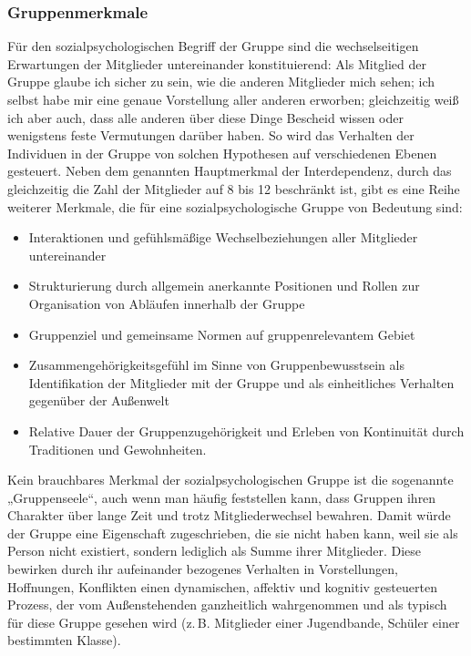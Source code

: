 \documentclass[12pt]{scrartcl}
\DeclareRobustCommand{\zB}{z.\,B.\xspace}
\begin{document}
\subsubsection{Gruppenmerkmale} \label{subsec:Gruppenmerkmale}
Für den sozialpsychologischen Begriff der Gruppe sind die wechselseitigen
Erwartungen der Mitglieder untereinander konstituierend: Als Mitglied der
Gruppe glaube ich sicher zu sein, wie die anderen Mitglieder mich sehen; ich
selbst habe mir eine genaue Vorstellung aller anderen erworben; gleichzeitig
weiß ich aber auch, dass alle anderen über diese Dinge Bescheid wissen oder
wenigstens feste Vermutungen darüber haben. So wird das Verhalten der
Individuen in der Gruppe von solchen Hypothesen auf verschiedenen Ebenen
gesteuert. Neben dem genannten Hauptmerkmal der Interdependenz, durch das
gleichzeitig die Zahl der Mitglieder auf 8 bis 12 beschränkt ist, gibt es eine
Reihe weiterer Merkmale, die für eine sozialpsychologische Gruppe von Bedeutung
sind:
\begin{itemize}
	\item Interaktionen und gefühlsmäßige Wechselbeziehungen aller Mitglieder
		untereinander
	\item Strukturierung durch allgemein anerkannte Positionen und Rollen zur
		Organisation von Abläufen innerhalb der Gruppe
	\item Gruppenziel und gemeinsame Normen auf gruppenrelevantem Gebiet
	\item Zusammengehörigkeitsgefühl im Sinne von Gruppenbewusstsein als
		Identifikation der Mitglieder mit der Gruppe und als einheitliches
		Verhalten gegenüber der Außenwelt
	\item Relative Dauer der Gruppenzugehörigkeit und Erleben von Kontinuität
		durch Traditionen und Gewohnheiten.
\end{itemize}
Kein brauchbares Merkmal der sozialpsychologischen Gruppe ist die sogenannte
„Gruppenseele“, auch wenn man häufig feststellen kann, dass Gruppen ihren
Charakter über lange Zeit und trotz Mitgliederwechsel bewahren. Damit würde der
Gruppe eine Eigenschaft zugeschrieben, die sie nicht haben kann, weil sie als
Person nicht existiert, sondern lediglich als Summe ihrer Mitglieder. Diese
bewirken durch ihr aufeinander bezogenes Verhalten in Vorstellungen,
Hoffnungen, Konflikten einen dynamischen, affektiv und kognitiv gesteuerten
Prozess, der vom Außenstehenden ganzheitlich wahrgenommen und als typisch für
diese Gruppe gesehen wird (\zB Mitglieder einer Jugendbande, Schüler einer
bestimmten Klasse).
\end{document}
